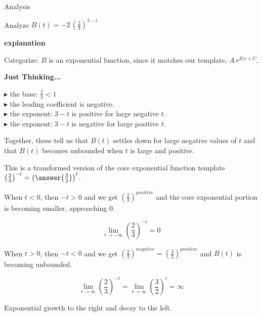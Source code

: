 \documentclass{ximera}
\begin{document}
\begin{example}  Analysis



Analyze   $B(t) = -2 \, \left( \frac{2}{3} \right)^{3-t}$ 



\textbf{\textcolor{red!75!green}{explanation}} 



Categorize: $B$ is an exponential function, since it matches our template, $A \, r^{B \, x + C} $. 





\textbf{Just Thinking...}  

$\blacktriangleright$  the base: $\frac{2}{3} < 1$   \\
$\blacktriangleright$  the leading coefficient is negative.  \\
$\blacktriangleright$  the exponent: $3-t$ is positive for large negative $t$. \\
$\blacktriangleright$  the exponent: $3-t$ is negative for large positive $t$. 



Together, these tell us that $B(t)$ settles down for large negative values of $t$ and that $B(t)$ becomes unbounded when $t$ is large and positive.



This is a transformed version of the core exponential function template $\left( \frac{2}{3} \right)^{-t} = \left( \answer{\frac{3}{2}} \right)^t$.  



When $t < 0$, then $-t > 0$ and we get  $\left( \frac{2}{3} \right)^{positive}$ and the core exponential portion is becoming smaller, approaching $0$.  





\[ \lim\limits_{t \to -\infty} \left( \frac{2}{3} \right)^{-t}  = 0 \]



When $t > 0$, then $-t < 0$ and we get  $\left( \frac{2}{3} \right)^{negative} = \left( \frac{3}{2} \right)^{positive}$ and $B(t)$ is becoming unbounded.  



\[ \lim\limits_{t \to \infty} \left( \frac{2}{3} \right)^{-t}  = \lim\limits_{t \to \infty} \left( \frac{3}{2} \right)^t  = \infty \]




Exponential growth to the right and decay to the left.







\end{example}
\end{document}
